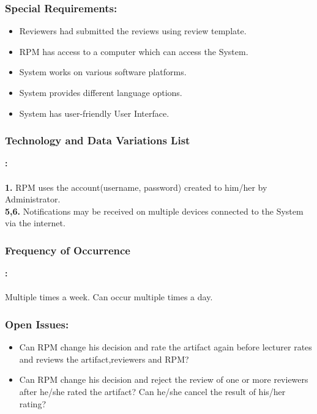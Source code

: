 \subsubsection*{Special Requirements:}
    \begin{itemize}
    \itemsep-1em 
       \item Reviewers had submitted the reviews using review template.
       \item  RPM has access to a computer which can access the System.
       \item  System works on various software platforms.
       \item  System provides different language options.
       \item  System has user-friendly User Interface.
    \end{itemize}
     

     \subsubsection*{Technology and Data Variations List}\textbf{:}
     \\
     \\
     \textbf{1.} RPM uses the account(username, password) created to him/her by Administrator.
      \\
      \textbf{5,6.} Notifications may be received on multiple devices connected to the System via the internet.
     \subsubsection*{Frequency of Occurrence}\textbf{:}
     \\
     \\
     Multiple times a week.  Can occur multiple times a day.
     
     
     
     \subsubsection*{Open Issues:}
    \begin{itemize}
    \itemsep-1em 
       \item Can RPM change his decision and rate the artifact again before lecturer rates and reviews the artifact,reviewers and RPM?
       \item Can RPM change his decision and reject the review of one or more reviewers after he/she rated the artifact?  Can he/she cancel the result of his/her rating?
    \end{itemize}
    
